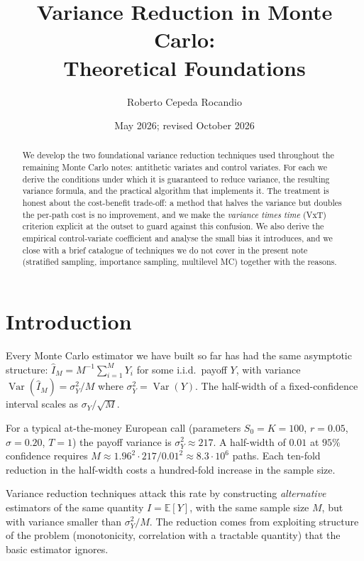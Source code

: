 \documentclass[11pt,a4paper]{article}
\title{Variance Reduction in Monte Carlo:\\
       Theoretical Foundations}
\author{Roberto Cepeda Rocandio}
\date{May 2026; revised October 2026}
\theoremstyle{plain}
\theoremstyle{definition}
\theoremstyle{remark}
\newcommand{\E}{\mathbb{E}}
\newcommand{\Var}{\operatorname{Var}}
\begin{document}
\maketitle

\begin{abstract}
We develop the two foundational variance reduction techniques used
throughout the remaining Monte Carlo notes: antithetic variates and control
variates. For each we derive the conditions under which it is
guaranteed to reduce variance, the resulting variance formula, and
the practical algorithm that implements it. The treatment is honest
about the cost-benefit trade-off: a method that halves the variance
but doubles the per-path cost is no improvement, and we make the
\emph{variance times time} (VxT) criterion explicit at the outset to
guard against this confusion. We also derive the empirical
control-variate coefficient and analyse the small bias it introduces,
and we close with a brief catalogue of techniques we do not cover in
the present note (stratified sampling, importance sampling,
multilevel MC) together with the reasons.
\end{abstract}

\tableofcontents

\section{Introduction}
\label{sec:intro}

Every Monte Carlo estimator we have built so far has had the same
asymptotic structure: $\hat I_M = M^{-1} \sum_{i=1}^M Y_i$ for some
i.i.d.\ payoff $Y$, with variance $\Var(\hat I_M) = \sigma^2_Y / M$
where $\sigma^2_Y = \Var(Y)$. The half-width of a fixed-confidence
interval scales as $\sigma_Y / \sqrt{M}$.

For a typical at-the-money European call (parameters $S_0 = K = 100$,
$r = 0.05$, $\sigma = 0.20$, $T = 1$) the payoff variance is
$\sigma^2_Y \approx 217$. A half-width of $0.01$ at $95\%$ confidence
requires $M \approx 1.96^2 \cdot 217 / 0.01^2 \approx 8.3
\cdot 10^6$ paths. Each ten-fold reduction in the half-width costs a
hundred-fold increase in the sample size.

Variance reduction techniques attack this rate by constructing
\emph{alternative} estimators of the same quantity $I = \E[Y]$, with
the same sample size $M$, but with variance smaller than $\sigma^2_Y
/ M$. The reduction comes from exploiting structure of the problem
(monotonicity, correlation with a tractable quantity) that the basic
estimator ignores.
\end{document}

